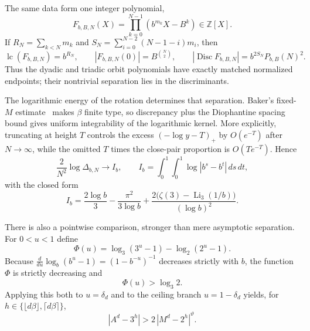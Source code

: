 \documentclass[11pt,oneside]{article}
\theoremstyle{definition}
\theoremstyle{remark}
\newcommand{\Z}{\mathbb Z}
\newcommand{\thetaq}{\vartheta}
\begin{document}
The same data form one integer polynomial,
\begin{equation}
 F_{b,B,N}(X)=\prod_{k=0}^{N-1}(b^{m_k}X-B^k)\in\Z[X].
 \label{sturmian:eq-orbit-polynomial}
\end{equation}
If $R_N=\sum_{k<N}m_k$ and
$S_N=\sum_{i=0}^{N-2}(N-1-i)m_i$, then
\begin{equation}
 \operatorname{lc}(F_{b,B,N})=b^{R_N},\qquad
 |F_{b,B,N}(0)|=B^{\binom N2},\qquad
 |\operatorname{Disc}F_{b,B,N}|=b^{2S_N}P_{b,B}(N)^2.
 \label{sturmian:eq-orbit-polynomial-data}
\end{equation}
Thus the dyadic and triadic orbit polynomials have exactly matched normalized endpoints; their
nontrivial separation lies in the discriminants.

The logarithmic energy of the rotation determines that separation.  Baker's fixed-$M$
estimate~\cite{Baker1975} makes $\beta$ finite type, so discrepancy plus the Diophantine spacing bound gives
uniform integrability of the logarithmic kernel.  More explicitly, truncating at height $T$
controls the excess $(-\log y-T)_+$ by $O(e^{-T})$ after $N\to\infty$, while the omitted
$T$ times the close-pair proportion is $O(Te^{-T})$.  Hence
\begin{equation}
 \frac{2}{N^2}\log\Delta_{b,N}\longrightarrow I_b,
 \qquad
 I_b=\int_0^1\!\int_0^1\log|b^s-b^t|\,ds\,dt,
 \label{sturmian:eq-energy-limit}
\end{equation}
with the closed form
\begin{equation}
 I_b=\frac{2\log b}{3}-\frac{\pi^2}{3\log b}
 +\frac{2\bigl(\zeta(3)-\operatorname{Li}_3(1/b)\bigr)}{(\log b)^2}.
 \label{sturmian:eq-energy-constant}
\end{equation}

There is also a pointwise comparison, stronger than mere asymptotic separation.  For
$0<u<1$ define
\[
 \Phi(u)=\log_3(3^u-1)-\log_2(2^u-1).
\]
Because $\frac{d}{du}\log_b(b^u-1)=(1-b^{-u})^{-1}$ decreases strictly with $b$, the function
$\Phi$ is strictly decreasing and
\begin{equation}
 \Phi(u)>\log_3 2.
 \label{sturmian:eq-gap-amplification}
\end{equation}
Applying this both to $u=\delta_d$ and to the ceiling branch $u=1-\delta_d$ yields, for
$h\in\{\lfloor d\beta\rfloor,\lceil d\beta\rceil\}$,
\begin{equation}
 |A^d-3^h|>2\,|M^d-2^h|^{\thetaq}.
 \label{sturmian:eq-matched-gap}
\end{equation}
\end{document}

